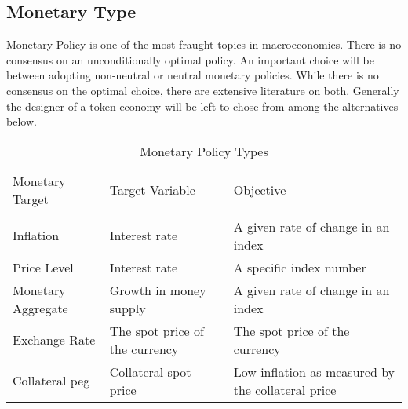 \documentclass[11pt]{article}
\begin{document}
\begin{center}
\end{center}

\subsection{Monetary Type}
Monetary Policy is one of the most fraught topics in macroeconomics. There is no consensus on an unconditionally optimal policy. An important choice will be between adopting non-neutral or neutral monetary policies. While there is no consensus on the optimal choice, there are extensive literature on both. Generally the designer of a token-economy will be left to chose from among the alternatives below.
\begin{table}[!ht]
\caption{Monetary Policy Types} %
\centering %
\begin{tabular}{l l l} %
\hline\hline %
Monetary Target & Target Variable & Objective \\ [0.5ex]
\\ [0.5ex]
\hline %
Inflation & Interest rate & A given rate of change in an index \\
Price Level & Interest rate & A specific index number \\
Monetary Aggregate & Growth in money supply & A given rate of change in an index \\ 
Exchange Rate & The spot price of the currency & The spot price of the currency \\ 
Collateral peg & Collateral spot price & Low inflation as measured by the collateral price \\ 
\hline %

\end{tabular}
\end{table}
\end{document}
